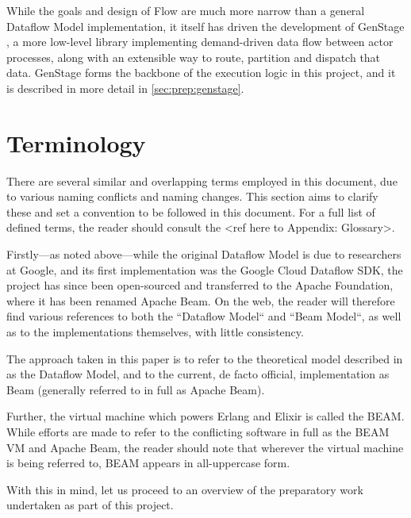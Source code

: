 While the goals and design of Flow are much more narrow than a general Dataflow Model implementation, it itself has driven the development of GenStage \cite{ElixirGenStage}, a more low-level library implementing demand-driven data flow between actor processes, along with an extensible way to route, partition and dispatch that data.
GenStage forms the backbone of the execution logic in this project, and it is described in more detail in \cref{sec:prep:genstage}.
\newpage
\section{Terminology}\label{sec:intro:terminology}

There are several similar and overlapping terms employed in this document, due to various naming conflicts and naming changes\footnotemark.
This section aims to clarify these and set a convention to be followed in this document.
For a full list of defined terms, the reader should consult the <ref here to Appendix: Glossary>.


Firstly---as noted above---while the original Dataflow Model is due to researchers at Google, and its first implementation was the Google Cloud Dataflow SDK, the project has since been open-sourced and transferred to the Apache Foundation, where it has been renamed Apache Beam.
On the web, the reader will therefore find various references to both the ``Dataflow Model`` and ``Beam Model``, as well as to the implementations themselves, with little consistency.

The approach taken in this paper is to refer to the theoretical model described in \cite{Akidau:2015} as the Dataflow Model, and to the current, de facto official, implementation \cite{ApacheBeam} as Beam (generally referred to in full as Apache Beam).

Further, the virtual machine which powers Erlang and Elixir is called the BEAM.
While efforts are made to refer to the conflicting software in full as the BEAM VM and Apache Beam, the reader should note that wherever the virtual machine is being referred to, BEAM appears in all-uppercase form.

With this in mind, let us proceed to an overview of the preparatory work undertaken as part of this project.

